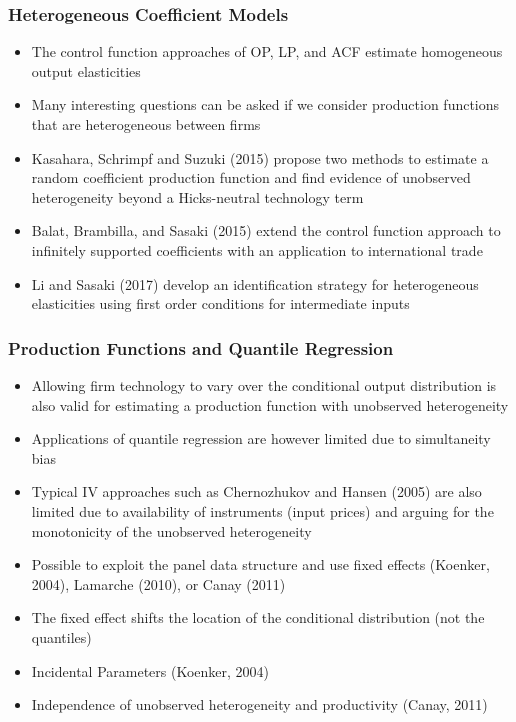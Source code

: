 \documentclass{beamer}
\begin{document}

\begin{frame}
\frametitle{Heterogeneous Coefficient Models}
\begin{itemize}
	\item The control function approaches of OP, LP, and ACF estimate homogeneous output elasticities
	\item Many interesting questions can be asked if we consider production functions that are heterogeneous between firms
	\item Kasahara, Schrimpf and Suzuki (2015) propose two methods to estimate a random coefficient production function and find evidence of unobserved heterogeneity beyond a Hicks-neutral technology term
	\item Balat, Brambilla, and Sasaki (2015) extend the control function approach to infinitely supported coefficients with an application to international trade
	\item Li and Sasaki (2017) develop an identification strategy for heterogeneous elasticities using first order conditions for intermediate inputs
\end{itemize}
\end{frame}

\begin{frame}
\frametitle{Production Functions and Quantile Regression}
\begin{itemize}
	\item Allowing firm technology to vary over the conditional output distribution is also valid for estimating a production function with unobserved heterogeneity
	\item Applications of quantile regression are however limited due to simultaneity bias
	\item Typical IV approaches such as Chernozhukov and Hansen (2005) are also limited due to availability of instruments (input prices) and arguing for the monotonicity of the unobserved heterogeneity
	\item Possible to exploit the panel data structure and use fixed effects (Koenker, 2004), Lamarche (2010), or Canay (2011)
	\item The fixed effect shifts the location of the conditional distribution (not the quantiles)
	\item Incidental Parameters (Koenker, 2004)
	\item Independence of unobserved heterogeneity and productivity (Canay, 2011)
	
\end{itemize}
\end{frame}
\end{document}
